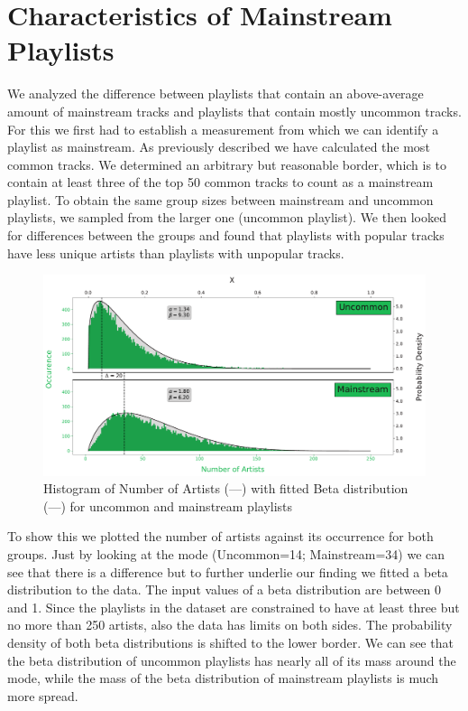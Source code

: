 \section{Characteristics of Mainstream Playlists}
We analyzed the difference between playlists that contain an above-average amount of mainstream tracks and playlists that contain mostly uncommon tracks. For this we first had to establish a measurement from which we can identify a playlist as mainstream. As previously described we have calculated the most common tracks. We determined an arbitrary but reasonable border, which is to contain at least three of the top 50 common tracks to count as a mainstream playlist. To obtain the same group sizes between mainstream and uncommon playlists, we sampled from the larger one (uncommon playlist). We then looked for differences between the groups and found that playlists with popular tracks have less unique artists than playlists with unpopular tracks. 

\begin{figure}[ht]
    \centering
    \includegraphics[width=\textwidth]{fig/pop_unpop_artist.pdf}
    \caption{Histogram of Number of Artists (\textcolor{spotifygreen}{---}) with fitted Beta distribution (\textcolor{black}{---}) for uncommon and mainstream playlists}
    \label{fig:pop_unppo_artist}
\end{figure}

To show this we plotted the number of artists against its occurrence for both groups. Just by looking at the mode (Uncommon=14; Mainstream=34) we can see that there is a difference but to further underlie our finding we fitted a beta distribution to the data. The input values of a beta distribution are between 0 and 1. Since the playlists in the dataset are constrained to have at least three but no more than 250 artists, also the data has limits on both sides. The probability density of both beta distributions is shifted to the lower border. We can see that the beta distribution of uncommon playlists has nearly all of its mass around the mode, while the mass of the beta distribution of mainstream playlists is much more spread.

